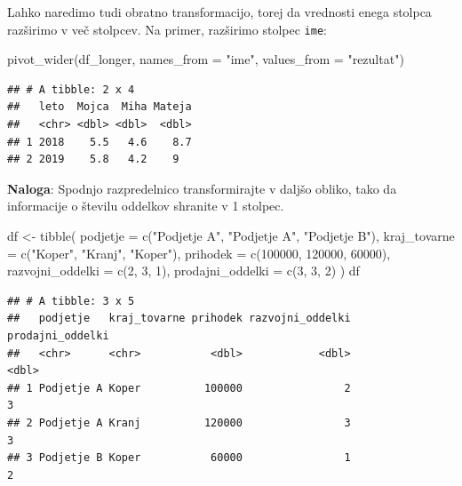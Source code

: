 \documentclass[
]{book}
\newenvironment{Shaded}{\begin{snugshade}}{\end{snugshade}}
\newcommand{\AttributeTok}[1]{\textcolor[rgb]{0.77,0.63,0.00}{#1}}
\newcommand{\DecValTok}[1]{\textcolor[rgb]{0.00,0.00,0.81}{#1}}
\newcommand{\FunctionTok}[1]{\textcolor[rgb]{0.00,0.00,0.00}{#1}}
\newcommand{\NormalTok}[1]{#1}
\newcommand{\OtherTok}[1]{\textcolor[rgb]{0.56,0.35,0.01}{#1}}
\newcommand{\StringTok}[1]{\textcolor[rgb]{0.31,0.60,0.02}{#1}}
\begin{document}
Lahko naredimo tudi obratno transformacijo, torej da vrednosti enega stolpca razširimo v več stolpcev. Na primer, razširimo stolpec \texttt{ime}:

\begin{Shaded}
\begin{Highlighting}[]
\FunctionTok{pivot\_wider}\NormalTok{(df\_longer, }\AttributeTok{names\_from =} \StringTok{"ime"}\NormalTok{, }\AttributeTok{values\_from =} \StringTok{"rezultat"}\NormalTok{)}
\end{Highlighting}
\end{Shaded}

\begin{verbatim}
## # A tibble: 2 x 4
##   leto  Mojca  Miha Mateja
##   <chr> <dbl> <dbl>  <dbl>
## 1 2018    5.5   4.6    8.7
## 2 2019    5.8   4.2    9
\end{verbatim}

\textbf{Naloga}: Spodnjo razpredelnico transformirajte v daljšo obliko, tako da informacije o številu oddelkov shranite v 1 stolpec.

\begin{Shaded}
\begin{Highlighting}[]
\NormalTok{df }\OtherTok{\textless{}{-}} \FunctionTok{tibble}\NormalTok{(}
  \AttributeTok{podjetje =} \FunctionTok{c}\NormalTok{(}\StringTok{"Podjetje A"}\NormalTok{, }\StringTok{"Podjetje A"}\NormalTok{, }\StringTok{"Podjetje B"}\NormalTok{),}
  \AttributeTok{kraj\_tovarne =} \FunctionTok{c}\NormalTok{(}\StringTok{"Koper"}\NormalTok{, }\StringTok{"Kranj"}\NormalTok{, }\StringTok{"Koper"}\NormalTok{),}
  \AttributeTok{prihodek =} \FunctionTok{c}\NormalTok{(}\DecValTok{100000}\NormalTok{, }\DecValTok{120000}\NormalTok{, }\DecValTok{60000}\NormalTok{),}
  \AttributeTok{razvojni\_oddelki =} \FunctionTok{c}\NormalTok{(}\DecValTok{2}\NormalTok{, }\DecValTok{3}\NormalTok{, }\DecValTok{1}\NormalTok{),}
  \AttributeTok{prodajni\_oddelki =} \FunctionTok{c}\NormalTok{(}\DecValTok{3}\NormalTok{, }\DecValTok{3}\NormalTok{, }\DecValTok{2}\NormalTok{)}
\NormalTok{)}
\NormalTok{df}
\end{Highlighting}
\end{Shaded}

\begin{verbatim}
## # A tibble: 3 x 5
##   podjetje   kraj_tovarne prihodek razvojni_oddelki prodajni_oddelki
##   <chr>      <chr>           <dbl>            <dbl>            <dbl>
## 1 Podjetje A Koper          100000                2                3
## 2 Podjetje A Kranj          120000                3                3
## 3 Podjetje B Koper           60000                1                2
\end{verbatim}
\end{document}
